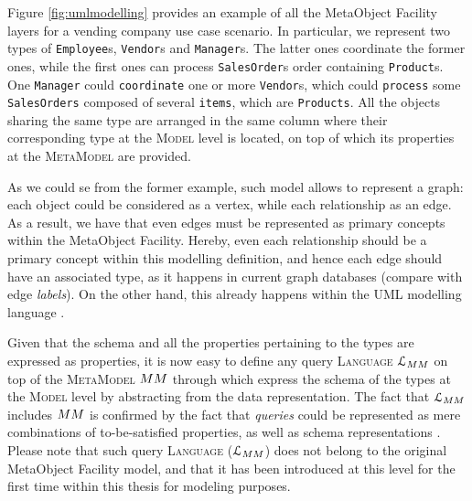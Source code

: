 \begin{example}
	Figure \ref{fig:umlmodelling} provides an example of all the MetaObject Facility layers for a vending company use case scenario. In particular, we represent two types of \texttt{Employee}s, \texttt{Vendor}s and \texttt{Manager}s. The latter ones coordinate the former ones, while the first ones can process \texttt{SalesOrder}s order containing \texttt{Product}s. One \texttt{Manager} could \texttt{coordinate} one or more \texttt{Vendor}s, which could \texttt{process} some \texttt{SalesOrders} composed of several \texttt{items}, which are \texttt{Products}. All the objects sharing the same type are arranged in the same column where their corresponding type at the \textsc{Model} level is located, on top of which its properties at the \textsc{MetaModel} are provided.
\end{example}

As we could se from the former example, such model allows to represent a graph: each object could be considered as a vertex, while each relationship as an edge. As a result, we have that even edges must be represented as primary concepts within the  MetaObject Facility. Hereby, even each relationship should be a primary concept within this modelling definition, and hence each edge should have an associated type, as it happens in current graph databases (compare with edge \textit{labels}). On the other hand, this already happens within the UML modelling language \cite{OMG2011a, OMG2011}.

Given that the schema and all the properties pertaining to the types are expressed as properties, it is now easy to define any query \textsc{Language} $\langg_\metamodel$ on top of the \textsc{MetaModel} $\metamodel$ through which express the schema of the types at the \textsc{Model} level by abstracting from the data representation. The fact that $\langg_\metamodel$ includes $\metamodel$ is confirmed by the fact that \textit{queries} could be represented as mere combinations of to-be-satisfied properties, as well as schema representations \cite{Lenzerini02}. Please note that such query  \textsc{Language} ($\langg_\metamodel$) does not belong to the original MetaObject Facility model, and that it has been introduced at this level for the first time within this thesis for modeling purposes.


